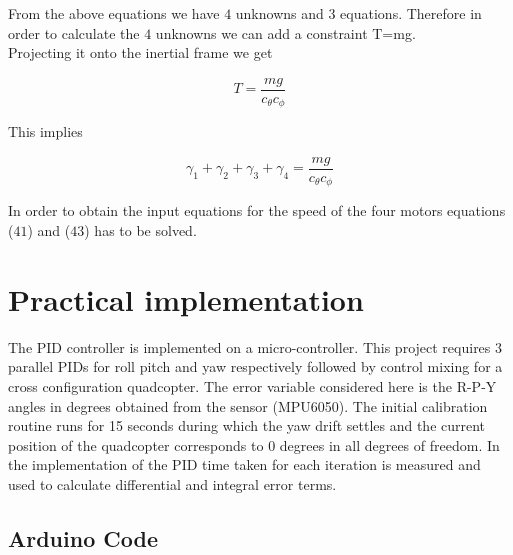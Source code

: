 \documentclass[9pt]{article}
\begin{document}
\noindent From the above equations we have $4$ unknowns and $3$ equations. Therefore in order to calculate the $4$ unknowns we can add a constraint T=mg.\\

\noindent Projecting it onto the inertial frame we get

\begin{equation}
T=\frac{mg}{c_{\theta}c_{\phi}}
\end{equation}

\noindent This implies

\begin{equation}
\gamma_{1} + \gamma_{2} + \gamma_{3} + \gamma_{4}=\frac{mg}{c_{\theta}c_{\phi}}
\end{equation}

\noindent In order to obtain the input equations for the speed of the four motors equations ($41$) and ($43$) has to be solved.

\section{Practical implementation}
\noindent The PID controller is implemented on a micro-controller. This project requires $3$ parallel PIDs for roll pitch and yaw respectively followed by control mixing for a cross configuration quadcopter.
The error variable considered here is the R-P-Y angles in degrees obtained from the sensor (MPU6050). The initial calibration routine runs for 15 seconds during which the yaw drift settles and the current position of the quadcopter corresponds to 0 degrees in all degrees of freedom. In the implementation of the PID time taken for each iteration is measured and used to calculate differential and integral error terms.

\subsection{Arduino Code}
\end{document}
